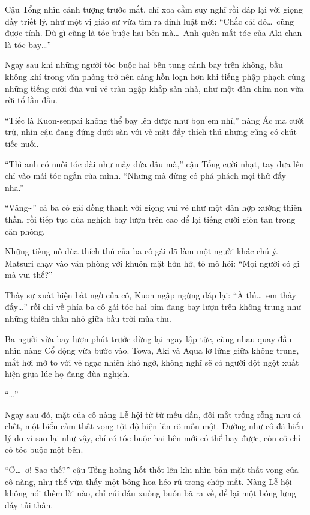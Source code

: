 \documentclass[../main.tex]{subfiles}
\begin{document}
Cậu Tổng nhìn cảnh tượng trước mắt, chỉ xoa cằm suy nghĩ rồi đáp lại với giọng đầy triết lý, như một vị giáo sư vừa tìm ra định luật mới: ``Chắc cái đó\dots\ cũng được tính. Dù gì cũng là tóc buộc hai bên mà\dots\ Anh quên mất tóc của Aki-chan là tóc bay\dots''

Ngay sau khi những người tóc buộc hai bên tung cánh bay trên không, bầu không khí trong văn phòng trở nên càng hỗn loạn hơn khi tiếng phập phạch cùng những tiếng cười đùa vui vẻ tràn ngập khắp sàn nhà, như một đàn chim non vừa rời tổ lần đầu.

``Tiếc là Kuon-senpai không thể bay lên được như bọn em nhỉ,'' nàng Ác ma cười trừ, nhìn cậu đang đứng dưới sàn với vẻ mặt đầy thích thú nhưng cũng có chút tiếc nuối.

``Thì anh có nuôi tóc dài như mấy đứa đâu mà,'' cậu Tổng cười nhạt, tay đưa lên chỉ vào mái tóc ngắn của mình. ``Nhưng mà đừng có phá phách mọi thứ đấy nha.''

``Vâng\~{}'' cả ba cô gái đồng thanh với giọng vui vẻ như một dàn hợp xướng thiên thần, rồi tiếp tục đùa nghịch bay lượn trên cao để lại tiếng cười giòn tan trong căn phòng.

\ct

Những tiếng nô đùa thích thú của ba cô gái đã làm một người khác chú ý. Matsuri chạy vào văn phòng với khuôn mặt hớn hở, tò mò hỏi: ``Mọi người có gì mà vui thế?''

Thấy sự xuất hiện bất ngờ của cô, Kuon ngập ngừng đáp lại: ``À thì\dots\ em thấy đấy\dots'' rồi chỉ về phía ba cô gái tóc hai bím đang bay lượn trên không trung như những thiên thần nhỏ giữa bầu trời mùa thu.

Ba người vừa bay lượn phút trước dừng lại ngay lập tức, cùng nhau quay đầu nhìn nàng Cổ động vừa bước vào. Towa, Aki và Aqua lơ lửng giữa không trung, mắt hơi mở to với vẻ ngạc nhiên khó ngờ, không nghĩ sẽ có người đột ngột xuất hiện giữa lúc họ đang đùa nghịch.


``\dots''

Ngay sau đó, mặt của cô nàng Lễ hội từ từ mếu dần, đôi mắt trống rỗng như cá chết, một biểu cảm thất vọng tột độ hiện lên rõ mồn một. Dường như cô đã hiểu lý do vì sao lại như vậy, chỉ có tóc buộc hai bên mới có thể bay được, còn cô chỉ có tóc buộc một bên.

``Ơ\dots\ ơ! Sao thế?'' cậu Tổng hoảng hốt thốt lên khi nhìn bản mặt thất vọng của cô nàng, như thể vừa thấy một bông hoa héo rũ trong chớp mắt. Nàng Lễ hội không nói thêm lời nào, chỉ cúi đầu xuống buồn bã ra về, để lại một bóng lưng đầy tủi thân.
\end{document}

